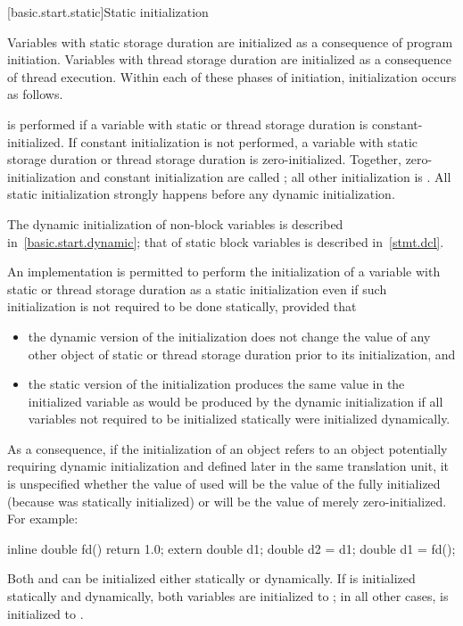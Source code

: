 [basic.start.static]{Static initialization}

\pnum
{}%
%
Variables with static storage duration
are initialized as a consequence of program initiation. Variables with
thread storage duration are initialized as a consequence of thread execution.
Within each of these phases of initiation, initialization occurs as follows.

\pnum
{}%
 is performed
if a variable with static or thread storage duration
is constant-initialized.
%
If constant initialization is not performed, a variable with static
storage duration or thread storage
duration is zero-initialized.
Together, zero-initialization and constant initialization are called
;
all other initialization is .
All static initialization strongly happens before
any dynamic initialization.
\begin{note}
The dynamic initialization of non-block variables is described
in~\ref{basic.start.dynamic}; that of static block variables is described
in~\ref{stmt.dcl}.
\end{note}

\pnum
An implementation is permitted to perform the initialization of a
variable with static or thread storage duration as a static
initialization even if such initialization is not required to be done
statically, provided that
\begin{itemize}
\item
the dynamic version of the initialization does not change the
value of any other object of static or thread storage duration
prior to its initialization, and

\item
the static version of the initialization produces the same value
in the initialized variable as would be produced by the dynamic
initialization if all variables not required to be initialized statically
were initialized dynamically.
\end{itemize}
\begin{note}
As a consequence, if the initialization of an object  refers to an
object  potentially requiring dynamic initialization and defined
later in the same translation unit, it is unspecified whether the value of  used
will be the value of the fully initialized  (because  was statically
initialized) or will be the value of  merely zero-initialized. For example:
\begin{codeblock}
inline double fd() { return 1.0; }
extern double d1;
double d2 = d1;
double d1 = fd();
\end{codeblock}
Both  and  can be initialized
either statically or dynamically.
If  is initialized statically and  dynamically,
both variables are initialized to ;
in all other cases,  is initialized to .
\end{note}

